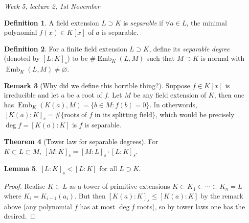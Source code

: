 \documentclass{article}
\newcommand{\Emb}{\operatorname{Emb}}
\theoremstyle{definition}
\newtheorem{defn}{Definition}[subsection]
\newtheorem{thm}[defn]{Theorem}
\newtheorem{lemma}[defn]{Lemma}
\newtheorem{remark}[defn]{Remark}
\begin{document}
\begin{flushright}
\textit{Week 5, lecture 2, 1st November}
\end{flushright}

\begin{defn}
A field extension $L\supset K$ is \textit{separable} if $\forall a\in L$, the minimal polynomial $f(x)\in K[x]$ of $a$ is separable.
\end{defn}

\begin{defn}
For a finite field extension $L\supset K$, define its \textit{separable degree} (denoted by $[L:K]_s$) to be $\#\Emb_K(L,M)$ such that $M\supset K$ is normal with $\Emb_K(L,M)\neq\varnothing$.
\end{defn}

\begin{remark}[Why did we define this horrible thing?]
\label{remark:motivationSepdeg}
Suppose $f\in K[x]$ is irreducible and let $a$ be a root of $f$. Let $M$ be any field extension of $K$, then one has $\Emb_K(K(a),M)=\{b\in M:f(b)=0\}$. In otherwords, $[K(a):K]_s=\#\{\text{roots of }f\text{ in its splitting field}\}$, which would be precisely $\deg f=[K(a):K]$ is $f$ is separable.
\end{remark}

\begin{thm}[Tower law for separable degrees]
\label{thm:towerlawS}
For $K\subset L\subset M,\ [M:K]_s=[M:L]_s\cdot [L:K]_s$.
\end{thm}

\begin{lemma}
\label{lemma:lastthmCh5}
$[L:K]_s<[L:K]$ for all $L\supset K$.
\end{lemma}
\begin{proof}
Realise $K\subset L$ as a tower of primitive extensions $K\subset K_1\subset\cdots\subset K_n=L$ where $K_i=K_{i-1}(a_i)$. But then $[K(a):K]_s\leq [K(a):K]$ by the remark above (any polynomial $f$ has at most $\deg f$ roots), so by tower laws one has the desired.
\end{proof}
\end{document}
